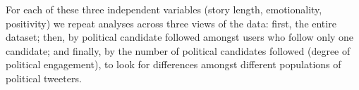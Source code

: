 \documentclass[letterpaper]{article}
\begin{document}
For each of these three independent variables (story length, emotionality, positivity) we repeat analyses across three views of the data: first, the entire dataset; then, by political candidate followed amongst users who follow only one candidate; and finally, by the number of political candidates followed (degree of political engagement), to look for differences amongst different populations of political tweeters.




    
\end{document}
